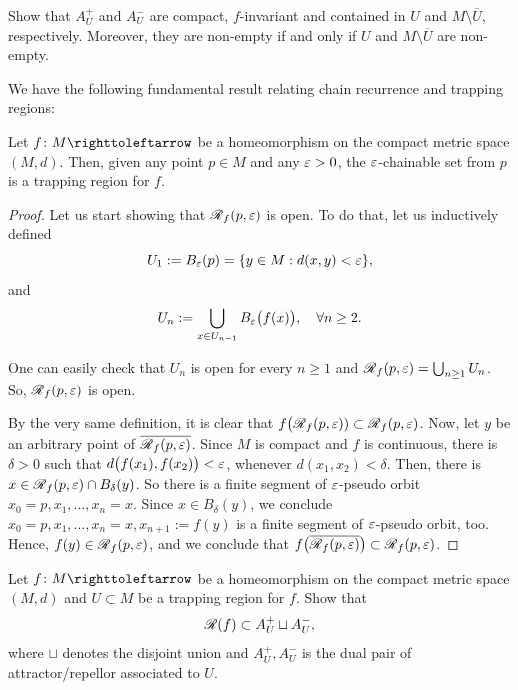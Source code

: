 \begin{exercise}
  Show that $A_U^+$ and $A_U^-$ are compact, $f$-invariant and contained in $U$ and $M\setminus\overline{U}$, respectively. Moreover, they are non-empty if and only if $U$ and $M\setminus\overline{U}$ are non-empty.
\end{exercise}

We have the following fundamental result relating chain recurrence and trapping regions:
\begin{proposition}
  \label{prop:chain-recurrence-trapping-regions}
  Let $f\colon M\carr$ be a homeomorphism on the compact metric space $(M,d)$. Then, given any point $p\in M$ and any $\varepsilon>0$, the $\varepsilon$-chainable set from $p$ is a trapping region for $f$.
\end{proposition}

\begin{proof}
  Let us start showing that $\mathscr{R{}}_f(p,\varepsilon)$ is open. To do that, let us inductively defined
  \begin{displaymath}
    U_1:=B_\varepsilon(p)=\{y\in M : d(x,y)<\varepsilon\},
  \end{displaymath}
  and
  \begin{displaymath}
    U_n:=\bigcup_{x\in U_{n-1}} B_\varepsilon\big(f(x)\big), \quad\forall n\geq 2.
  \end{displaymath}

  One can easily check that $U_n$ is open for every $n\geq 1$ and $\mathscr{R{}}_f(p,\varepsilon)=\bigcup_{n\geq 1} U_n$. So, $\mathscr{R{}}_f(p,\varepsilon)$ is open.

  By the very same definition, it is clear that $f\big(\mathscr{R{}}_f(p,\varepsilon))\subset \mathscr{R{}}_f(p,\varepsilon)$. Now, let $y$ be an arbitrary point of $\overline{\mathscr{R{}}_f(p,\varepsilon)}$. Since $M$ is compact and $f$ is continuous, there is $\delta>0$ such that $d\big(f(x_1),f(x_2)\big)<\varepsilon$, whenever $d(x_1,x_2)<\delta$. Then, there is $x\in\mathscr{R{}}_f(p,\varepsilon)\cap B_\delta(y)$. So there is a finite segment of $\varepsilon$-pseudo orbit $x_0=p, x_1,\ldots,x_n=x$. Since $x\in B_\delta(y)$, we conclude $x_0=p, x_1,\ldots,x_n=x, x_{n+1}:=f(y)$ is a finite segment of $\varepsilon$-pseudo orbit, too. Hence, $f(y)\in\mathscr{R{}}_f(p,\varepsilon)$, and we conclude that $f\big(\overline{\mathscr{R{}}_f(p,\varepsilon)}\big)\subset \mathscr{R{}}_f(p,\varepsilon)$.
\end{proof}

\begin{exercise}
  Let $f\colon M\carr$ be a homeomorphism on the compact metric space $(M,d)$ and $U\subset M$ be a trapping region for $f$. Show that
  \begin{displaymath}
    \mathscr{R{}}(f)\subset A_U^+\sqcup A_U^-,
  \end{displaymath}
  where $\sqcup$ denotes the disjoint union and $A_U^+,A_U^-$ is the dual pair of attractor/repellor associated to $U$.
\end{exercise}

